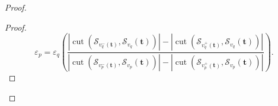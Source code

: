 \begin{proof}
\begin{proof}
{                \begin{equation*}
                    \varepsilon_p = \varepsilon_q \left ( \frac{\left|\operatorname{cut}\left(\mathcal{S}_{v_q^{-}(\mathbf{t})}, \mathcal{S}_{v_q}(\mathbf{t})\right)\right| - \left|\operatorname{cut}\left(\mathcal{S}_{v_q^{+}(\mathbf{t})}, \mathcal{S}_{v_q}(\mathbf{t})\right)\right|}{\left|\operatorname{cut}\left(\mathcal{S}_{v_p^{-}(\mathbf{t})}, \mathcal{S}_{v_p}(\mathbf{t})\right)\right| - \left|\operatorname{cut}\left(\mathcal{S}_{v_p^{+}(\mathbf{t})}, \mathcal{S}_{v_p}(\mathbf{t})\right)\right|} \right ).
                \end{equation*}
            }
        \end{proof}


\end{proof}
